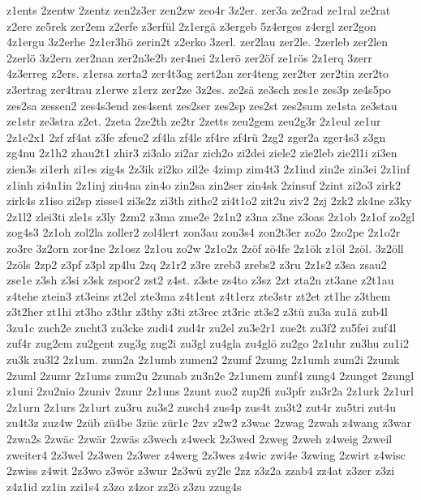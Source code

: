 {z1ents
2zentw
2zentz
zen2z3er
zen2zw
zeo4r
3z2er.
zer3a
ze2rad
ze1ral
ze2rat
z2ere
ze5rek
zer2em
z2erfe
z3erfül
2z1ergä
z3ergeb
5z4erges
z4ergl
zer2gon
4z1ergu
3z2erhe
2z1er3hö
zerin2t
z2erko
3zerl.
zer2lau
zer2le.
2zerleb
zer2len
2zerlö
3z2ern
zer2nan
zer2n3e2b
zer4nei
2z1erö
zer2öf
ze1rös
2z1erq
3zerr
4z3erreg
z2ers.
z1ersa
zerta2
zer4t3ag
zert2an
zer4teng
zer2ter
zer2tin
zer2to
z3ertrag
zer4trau
z1erwe
z1erz
zer2ze
3z2es.
ze2sä
ze3sch
zes1e
zes3p
ze4s5po
zes2sa
zessen2
zes4s3end
zes4sent
zes2ser
zes2sp
zes2st
zes2sum
ze1sta
ze3stau
ze1str
ze3stra
z2et.
2zeta
2ze2th
ze2tr
2zetts
zeu2gem
zeu2g3r
2z1eul
ze1ur
2z1e2x1
2zf
zf4at
z3fe
zfeue2
zf4la
zf4le
zf4re
zf4rü
2zg2
zger2a
zger4s3
z3gn
zg4nu
2z1h2
zhau2t1
zhir3
zi3alo
zi2ar
zich2o
zi2dei
ziele2
zie2leb
zie2l1i
zi3en
zien3s
zi1erh
zi1es
zig4s
2z3ik
zi2ko
zil2e
4zimp
zim4t3
2z1ind
zin2e
zin3ei
2z1inf
z1inh
zi4n1in
2z1inj
zin4na
zin4o
zin2sa
zin2ser
zin4sk
2zinsuf
2zint
zi2o3
zirk2
zirk4s
z1iso
zi2sp
zisse4
zi3s2z
zi3th
zithe2
zi4t1o2
zit2u
ziv2
2zj
2zk2
zk4ne
z3ky
2z1l2
zlei3ti
zle1s
z3ly
2zm2
z3ma
zme2e
2z1n2
z3na
z3ne
z3oas
2z1ob
2z1of
zo2gl
zog4s3
2z1oh
zol2la
zoller2
zol4lert
zon3au
zon3s4
zon2t3er
zo2o
2zo2pe
2z1o2r
zo3re
3z2orn
zor4ne
2z1osz
2z1ou
zo2w
2z1o2z
2zöf
zö4fe
2z1ök
z1öl
2zöl.
3z2öll
2zöls
2zp2
z3pf
z3pl
zp4lu
2zq
2z1r2
z3re
zreb3
zrebs2
z3ru
2z1s2
z3sa
zsau2
zse1e
z3sh
z3si
z3sk
zspor2
zst2
z4st.
z3ste
zs4to
z3sz
2zt
zta2n
zt3ane
z2t1au
z4tehe
ztein3
zt3eins
zt2el
zte3ma
z4t1ent
z4t1erz
zte3str
zt2et
zt1he
z3them
z3t2her
zt1hi
zt3ho
z3thr
z3thy
z3ti
zt3rec
zt3ric
zt3s2
z3tü
zu3a
zu1ä
zub4l
3zu1c
zuch2e
zucht3
zu3cke
zudi4
zud4r
zu2el
zu3e2r1
zue2t
zu3f2
zu5fei
zuf4l
zuf4r
zug2em
zu2gent
zug3g
zug2i
zu3gl
zu4gla
zu4glö
zu2go
2z1uhr
zu3hu
zu1i2
zu3k
zu3l2
2z1um.
zum2a
2z1umb
zumen2
2zumf
2zumg
2z1umh
zum2i
2zumk
2zuml
2zumr
2z1ums
zum2u
2zunab
zu3n2e
2z1unem
zunf4
zung4
2zunget
2zungl
z1uni
2zu2nio
2zuniv
2zunr
2z1uns
2zunt
zuo2
zup2fi
zu3pfr
zu3r2a
2z1urk
2z1url
2z1urn
2z1urs
2z1urt
zu3ru
zu3s2
zusch4
zus4p
zus4t
zu3t2
zut4r
zu5tri
zut4u
zu4t3z
zuz4w
2züb
zü4be
3züc
zür1c
2zv
z2w2
z3wac
2zwag
2zwah
z4wang
z3war
2zwa2s
2zwäc
2zwär
2zwäs
z3wech
z4weck
2z3wed
2zweg
2zweh
z4weig
2zweil
zweiter4
2z3wel
2z3wen
2z3wer
z4werg
2z3wes
z4wic
zwi4e
3zwing
2zwirt
z4wisc
2zwiss
z4wit
2z3wo
z3wör
z3wur
2z3wü
zy2le
2zz
z3z2a
zzab4
zz4at
z3zer
z3zi
z4z1id
zz1in
zzi1s4
z3zo
z4zor
zz2ö
z3zu
zzug4s
}

\endinput

